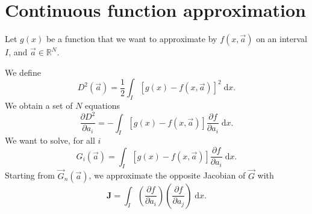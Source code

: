 \documentclass[aps,twocolumn]{revtex4}
\newcommand{\mymat}[1]{\boldsymbol{#1}}
\newcommand{\myd}{\mathrm{d}}
\begin{document}
\section{Continuous function approximation}
Let $g(x)$ be a function that we want to approximate by $f\left(x,\vec{a}\right)$ on an interval $I$,
and $\vec{a}\in \mathbb{R}^N$.

We define
\begin{equation}
	D^2\left(\vec{a}\right) =
	 \dfrac{1}{2} \int_I \left\lbrack g(x) - f\left(x,\vec{a}\right) \right\rbrack^2 \; \myd x.
\end{equation}
We obtain a set of $N$ equations
\begin{equation}
	 \dfrac{\partial D^2}{ \partial a_i } = - \int_I \left\lbrack g(x) - f\left(x,\vec{a}\right) \right\rbrack \dfrac{\partial f}{\partial a_i} \; \myd x.
\end{equation}
We want to solve, for all $i$
\begin{equation}
	G_i\left(\vec{a}\right) =\int_I \left\lbrack g(x) - f\left(x,\vec{a}\right) \right\rbrack \dfrac{\partial f}{\partial a_i} \; \myd x.
\end{equation}
Starting from $\vec{G}_n\left(\vec{a}\right)$, we approximate the opposite Jacobian of $\vec{G}$ with
\begin{equation}
	\mymat{J} = \int_I \left(\dfrac{\partial f}{\partial a_i}\right)\left(\dfrac{\partial f}{\partial a_j}\right)\; \myd x.
\end{equation}
\end{document}
